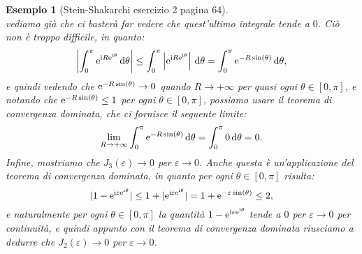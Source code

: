 \documentclass[11pt]{book}
\theoremstyle{Definizione}
\theoremstyle{TeoremaProposizioneLemmaCorollarioCongettura}
\theoremstyle{OsservazioneNotaEsempio}
\newtheorem{myes}{Esempio}[section]
\renewcommand{\i}{\textup{i}}
\newcommand{\e}{\textup{e}}
\renewcommand{\d}{\mathrm{d}}
\newcommand{\dtheta}{\, \d \theta}
\begin{document}
\begin{myes}[Stein-Shakarchi esercizio 2 pagina 64]
$$$$
vediamo già che ci basterà far vedere che quest'ultimo integrale tende a $0$. Ciò non è troppo difficile, in quanto:
$$
\left|\int_0^\pi \e^{\i R \e^{\i\theta}} \dtheta\right| \leq \int_0^{\pi } \left|\e^{\i R \e^{\i\theta}} \right|\dtheta = \int_0^{\pi} \e^{-R\sin(\theta)}\dtheta,
$$
e quindi vedendo che $\e^{-R\sin(\theta)} \to 0$ quando $R \to +\infty$ per quasi ogni $\theta\in [0,\pi]$, e notando che $\e^{-R\sin(\theta)} \leq 1$ per ogni $\theta\in [0,\pi]$, possiamo usare il teorema di convergenza dominata, che ci fornisce il seguente limite:
$$
\lim_{R \to +\infty} \int_{0}^{\pi} \e^{-R\sin(\theta)}\dtheta = \int_0^{\pi} 0 \dtheta = 0.
$$
Infine, mostriamo che $J_3(\varepsilon) \to 0$ per $\varepsilon \to 0$. Anche questa è un'applicazione del teorema di convergenza dominata, in quanto per ogni $\theta\in [0,\pi]$ risulta:
$$
|1-\e^{\i\varepsilon\e^{\i\theta}}|\leq 1 +|\e^{\i\varepsilon\e^{\i\theta}}| = 1+\e^{-\varepsilon\sin(\theta)} \leq 2,
$$
e naturalmente per ogni $\theta\in [0,\pi]$ la quantità $1-\e^{\i\varepsilon\e^{\i\theta}}$ tende a $0$ per $\varepsilon \to 0$ per continuità, e quindi appunto con il teorema di convergenza dominata riusciamo a dedurre che $J_2(\varepsilon) \to 0$ per $\varepsilon \to 0$.
\end{myes}
\end{document}
